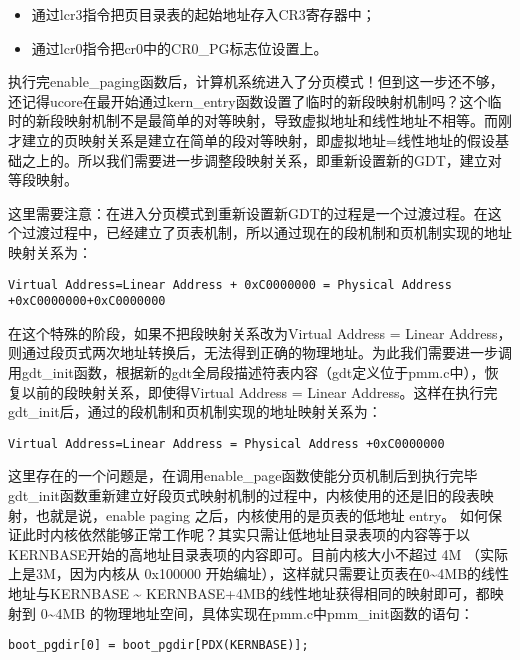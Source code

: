 \begin{itemize}
\tightlist
\item
  通过lcr3指令把页目录表的起始地址存入CR3寄存器中；
\item
  通过lcr0指令把cr0中的CR0\_PG标志位设置上。
\end{itemize}

执行完enable\_paging函数后，计算机系统进入了分页模式！但到这一步还不够，还记得ucore在最开始通过kern\_entry函数设置了临时的新段映射机制吗？这个临时的新段映射机制不是最简单的对等映射，导致虚拟地址和线性地址不相等。而刚才建立的页映射关系是建立在简单的段对等映射，即虚拟地址=线性地址的假设基础之上的。所以我们需要进一步调整段映射关系，即重新设置新的GDT，建立对等段映射。

这里需要注意：在进入分页模式到重新设置新GDT的过程是一个过渡过程。在这个过渡过程中，已经建立了页表机制，所以通过现在的段机制和页机制实现的地址映射关系为：

\begin{lstlisting}
Virtual Address=Linear Address + 0xC0000000 = Physical Address +0xC0000000+0xC0000000
\end{lstlisting}

在这个特殊的阶段，如果不把段映射关系改为Virtual Address = Linear
Address，则通过段页式两次地址转换后，无法得到正确的物理地址。为此我们需要进一步调用gdt\_init函数，根据新的gdt全局段描述符表内容（gdt定义位于pmm.c中），恢复以前的段映射关系，即使得Virtual
Address = Linear
Address。这样在执行完gdt\_init后，通过的段机制和页机制实现的地址映射关系为：

\begin{lstlisting}
Virtual Address=Linear Address = Physical Address +0xC0000000
\end{lstlisting}

这里存在的一个问题是，在调用enable\_page函数使能分页机制后到执行完毕gdt\_init函数重新建立好段页式映射机制的过程中，内核使用的还是旧的段表映射，也就是说，enable
paging 之后，内核使用的是页表的低地址 entry。
如何保证此时内核依然能够正常工作呢？其实只需让低地址目录表项的内容等于以KERNBASE开始的高地址目录表项的内容即可。目前内核大小不超过
4M （实际上是3M，因为内核从 0x100000
开始编址），这样就只需要让页表在0\textasciitilde{}4MB的线性地址与KERNBASE
\textasciitilde{} KERNBASE+4MB的线性地址获得相同的映射即可，都映射到
0\textasciitilde{}4MB
的物理地址空间，具体实现在pmm.c中pmm\_init函数的语句：

\begin{lstlisting}
boot_pgdir[0] = boot_pgdir[PDX(KERNBASE)];
\end{lstlisting}

